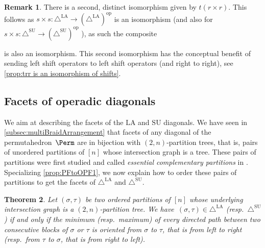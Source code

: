 \documentclass{amsart}
\newcommand{\darkblue}{\color{darkblue}} %
\newtheorem{theorem}{Theorem}[section]
\theoremstyle{definition}
\newtheorem{remark}[theorem]{Remark}
\newcommand{\resp}{resp.~} %
\newcommand{\defn}[1]{\textsl{\darkblue #1}} %
\newcommand{\SU}{\mathrm{SU}}
\newcommand{\LA}{\mathrm{LA}}
\newcommand{\SUD}{\triangle^{\mathrm{SU}}}
\newcommand{\LAD}{\triangle^{\mathrm{LA}}}
\newcommand{\op}{\mathrm{op}}
\begin{document}
\begin{remark} \label{rem:Alternate Isomorphism}
There is a second, distinct isomorphism given by $t(r\times r)$.
This follows as $s\times s:\LAD \to (\LAD)^{\op}$ is an isomorphism (and also for  $s\times s:\SUD \to (\SUD)^{\op}$ ), as such the composite 
\begin{center}
\end{center}
is also an isomorphism.
This second isomorphism has the conceptual benefit of sending left shift operators to left shift operators (and right to right), see \cref{prop:trr is an isomorphism of shifts}.
\end{remark}


\subsection{Facets of operadic diagonals}
\label{subsec:facets-operadic-diags}

We aim at describing the facets of the $\LA$ and $\SU$ diagonals. 
We have seen in \cref{subsec:multiBraidArrangement} that facets of any diagonal of the permutahedron~$\Perm$ are in bijection with $(2,n)$-partition trees, that is, pairs of unordered partitions of $[n]$ whose intersection graph is a tree.
These pairs of partitions were first studied and called \defn{essential complementary partitions} in \cite{Chen, ChenGoyal, KajitaniUenoChen}.
Specializing \cref{prop:PFtoOPF1}, we now explain how to order these pairs of partitions to get the facets of $\LAD$ and $\SUD$. 

\begin{theorem}
\label{thm:facet-ordering}
Let $(\sigma,\tau)$ be two ordered partitions of $[n]$ whose underlying intersection graph is a $(2,n)$-partition tree.
We have~$(\sigma,\tau) \in \LAD$ (\resp $\SUD$) if and only if the minimum (\resp maximum) of every directed path between two consecutive blocks of $\sigma$ or $\tau$ is oriented from $\sigma$ to $\tau$, that is from left to right (\resp from $\tau$ to $\sigma$, that is from right to left).
\end{theorem}
\end{document}
